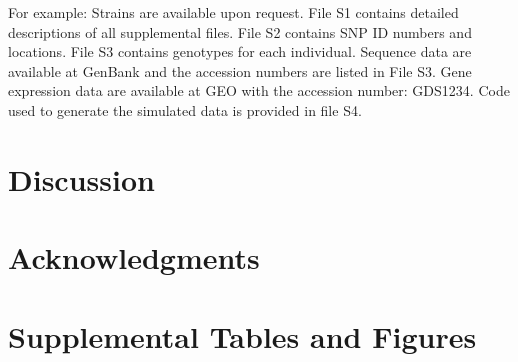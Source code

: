 \documentclass[9pt,twocolumn,twoside,lineno]{gsajnl}
\begin{document}
For example: Strains are available upon request. File S1 contains detailed descriptions of all supplemental files. File S2 contains SNP ID numbers and locations. File S3 contains genotypes for each individual. Sequence data are available at GenBank and the accession numbers are listed in File S3. Gene expression data are available at GEO with the accession number: GDS1234. Code used to generate the simulated data is provided in file S4. 


\section{Discussion}
\label{sec:discusion}

\section{Acknowledgments}
\label{sec:acknowledgments}



\newpage

\section*{Supplemental Tables and Figures}

\renewcommand{\thefigure}{S\arabic{figure}}
\renewcommand{\thetable}{S\arabic{table}}%
\linenumbers

\setcounter{figure}{0}
\setcounter{table}{0}
\end{document}
